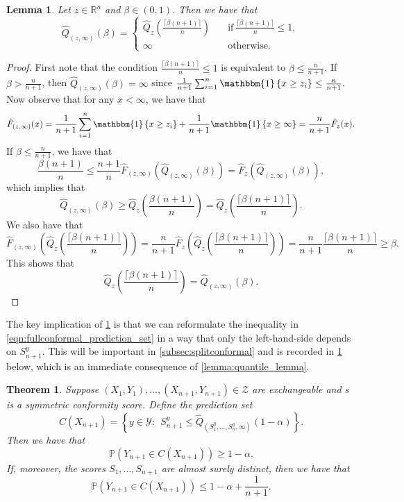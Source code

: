 \documentclass[11pt, titlepage]{article} %
\newcommand{\R}{\mathrm}
\newcommand{\Prob}[1]{\mathbb{P}\left( #1 \right)}
\newcommand{\Ind}[1]{\mathbbm{1}\left\{ #1 \right\}}
\numberwithin{equation}{section}
\newtheorem{theorem}{Theorem}
\newtheorem{lemma}{Lemma}
\theoremstyle{definition}
\numberwithin{theorem}{section}
\numberwithin{lemma}{section}
\numberwithin{corollary}{section}
\numberwithin{proposition}{section}
\numberwithin{definition}{section}
\numberwithin{remark}{section}
\begin{document}
\begin{lemma}
    Let \(z \in \mathbb{R}^n\) and \(\beta \in (0,1)\). Then we have that \[\hat{Q}_{(z,\infty)} (\beta) = \begin{cases}
        \hat{Q}_z\left( \frac{\lceil \beta (n+1) \rceil }{n} \right) \quad &\R{if} \ \frac{\lceil \beta(n+1) \rceil}{n} \leq 1, \\
        \infty \quad &\R{otherwise}.
        \end{cases}\]
\label{lemma:quantile_lemma_extra}
\end{lemma}
\begin{proof}
    First note that the condition \(\frac{\lceil \beta(n+1) \rceil}{n} \leq 1\) is equivalent to \(\beta \leq \frac{n}{n+1}\). If \(\beta > \frac{n}{n+1}\), then \(\hat{Q}_{(z, \infty)}(\beta) = \infty\) since \(\frac{1}{n+1}\sum_{i=1}^n \Ind{x \geq z_i} \leq \frac{n}{n+1}.\) Now observe that for any \(x < \infty\), we have that \[\hat{F}_{(z, \infty)}(x) = \frac{1}{n+1} \sum_{i=1}^{n}\Ind{x \geq z_i} + \frac{1}{n+1}\Ind{x \geq \infty} = \frac{n}{n+1} \hat{F}_z(x).\] If \(\beta \leq \frac{n}{n+1}\), we have that \[\frac{\beta(n+1)}{n} \leq \frac{n+1}{n}  \hat{F}_{(z,\infty)}(\hat{Q}_{(z,\infty)}(\beta)) = \hat{F}_{z}(\hat{Q}_{(z,\infty)}(\beta)),\] which implies that \[\hat{Q}_{(z,\infty)}(\beta) \geq \hat{Q}_{z}\left(\frac{\beta(n+1)}{n}\right) = \hat{Q}_z\left( \frac{\lceil \beta (n+1) \rceil }{n} \right).\] We also have that \[\hat{F}_{(z, \infty)}\left( \hat{Q}_z\left( \frac{\lceil \beta (n+1) \rceil }{n} \right) \right) = \frac{n}{n+1} \hat{F}_{z}\left( \hat{Q}_z\left( \frac{\lceil \beta (n+1) \rceil }{n} \right) \right) = \frac{n}{n+1}\frac{\lceil \beta (n+1) \rceil }{n} \geq \beta. \] This shows that \[\hat{Q}_z\left( \frac{\lceil \beta (n+1) \rceil }{n} \right) = \hat{Q}_{(z, \infty)}(\beta).\]
\end{proof}

\noindent
The key implication of \cref{lemma:quantile_lemma_extra} is that we can reformulate the inequality in \eqref{eqn:fullconformal_prediction_set} in a way that only the left-hand-side depends on \(S_{n+1}^y\). This will be important in \cref{subsec:splitconformal} and is recorded in \cref{thm:fullconformal_coverage_v2} below, which is an immediate consequence of \cref{lemma:quantile_lemma}.

\begin{theorem}
    Suppose \((X_1, Y_1), \ldots, (X_{n+1}, Y_{n+1}) \in \mathcal{Z}\) are exchangeable and \(s\) is a symmetric conformity score. Define the prediction set \[
        C(X_{n+1}) = \left\{ y \in \mathcal{Y}: \ \ S_{n+1}^y \leq \hat{Q}_{(S_1^y, \ldots, S_n^y, \infty)}(1-\alpha)  \right\}.
    \] Then we have that \[\Prob{Y_{n+1} \in C(X_{n+1})} \geq 1-\alpha.\] If, moreover, the scores \(S_1, \ldots, S_{n+1}\) are almost surely distinct, then we have that \[\Prob{Y_{n+1} \in C(X_{n+1})} \leq 1-\alpha + \frac{1}{n+1}.\]

\label{thm:fullconformal_coverage_v2}  
\end{theorem}
\end{document}
